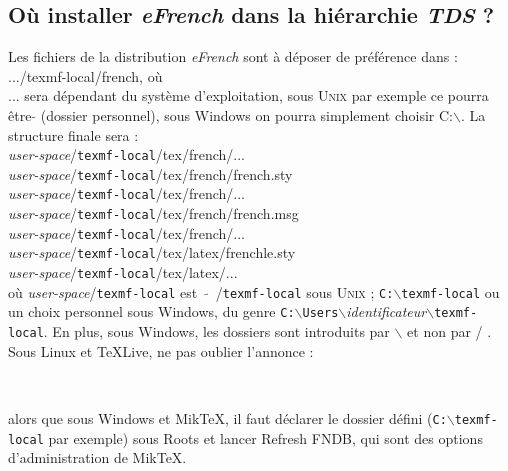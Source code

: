 \documentclass[a4paper,12pt,openright]{article}
\begin{document}
\begin{MAJ}
\subsection{Où installer \textit{eFrench} dans la hiérarchie \textit{TDS} ?}
  Les fichiers de la distribution \textit{eFrench} sont à déposer de
préférence dans :\\
 .../texmf-local/french, où \\
 ... sera dépendant du système d'exploitation,
sous \textsc{Unix} par exemple ce pourra être {\bf$\tilde{ }$} (dossier personnel), 
sous Windows on pourra simplement choisir C:$\backslash$.
La structure finale sera : \\[1ex]
\textit{user-space}/\texttt{texmf-local}/tex/french/...\\
\textit{user-space}/\texttt{texmf-local}/tex/french/french.sty\\
\textit{user-space}/\texttt{texmf-local}/tex/french/...\\
\textit{user-space}/\texttt{texmf-local}/tex/french/french.msg\\
\textit{user-space}/\texttt{texmf-local}/tex/french/...\\
\textit{user-space}/\texttt{texmf-local}/tex/latex/frenchle.sty\\
\textit{user-space}/\texttt{texmf-local}/tex/latex/...\\
où \textit{user-space}/\texttt{texmf-local} est ~{\bf $\tilde{ }$}~/\texttt{texmf-local} sous \textsc{Unix} ; \texttt{C:$\backslash$texmf-local}
ou un choix personnel sous Windows, du genre 
\texttt{C:$\backslash$Users$\backslash$}\textit{identificateur}\texttt{$\backslash$texmf-local}.
En plus, sous Windows,  les dossiers sont introduits par $\backslash$ et non par / .
Sous Linux et \TeX Live, ne pas oublier l'annonce :
\begin{center}
\\[1ex]
\end{center}
alors que sous Windows et Mik\TeX, il faut déclarer  le dossier défini (\texttt{C:$\backslash$texmf-local} par exemple)
sous {\sc Roots}\label{mikroot} et lancer {\sc Refresh FNDB}, qui sont des options d'administration de Mik\TeX.
\end{MAJ}
\end{document}
